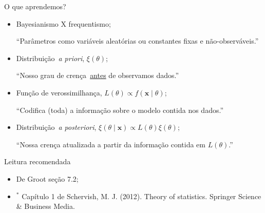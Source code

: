 \begin{frame}{O que aprendemos?}
\begin{itemize}
 \item[\faLightbulbO] Bayesianismo X frequentismo;
 
 ``Parâmetros como variáveis aleatórias ou constantes fixas e não-observáveis.''
 
 \item[\faHourglassStart] Distribuição~\textit{a priori}, $\xi(\theta)$;
 
 ``Nosso grau de crença~\underline{antes} de observamos dados.''
 
 \item[\faInfoCircle] Função de verossimilhança, $L(\theta) \propto f(\boldsymbol x \mid \theta)$;

 ``Codifica (toda) a informação sobre o modelo contida nos dados.''
 
 \item[\faHourglassEnd] Distribuição~\textit{a posteriori}, $\xi(\theta \mid \boldsymbol x) \propto L(\theta)\xi(\theta)$;
 
 ``Nossa crença atualizada a partir da informação contida em $L(\theta)$.''
 \end{itemize}
\end{frame}
\begin{frame}{Leitura recomendada}
\begin{itemize}
 \item[\faBook] De Groot seção 7.2;
 \item[\faBook] $^\ast$ Capítulo 1 de Schervish, M. J. (2012). Theory of statistics. Springer Science \& Business Media.
\end{itemize} 
\end{frame}
